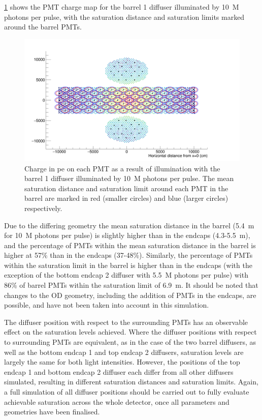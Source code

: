\documentclass[a4paper,11pt]{article}
\begin{document}
\cref{fig:pmtmap_with_limits} shows the PMT charge map for the barrel 1 diffuser illuminated by 10~M photons per pulse, with the saturation distance and saturation limits marked around the barrel PMTs.

\begin{figure}[ht!]
\centering
\includegraphics[width=0.7\linewidth]{diffuse_QCoverage_with_limits.png}
         \caption{Charge in pe on each PMT as a result of illumination with the barrel 1 diffuser illuminated by 10~M photons per pulse. The mean saturation distance and saturation limit around each PMT in the barrel are marked in red (smaller circles) and blue (larger circles) respectively.}
         \label{fig:pmtmap_with_limits}
\end{figure}

Due to the differing geometry the mean saturation distance in the barrel (5.4~m for 10~M photons per pulse) is slightly higher than in the endcaps (4.3-5.5~m), and the percentage of PMTs within the mean saturation distance in the barrel is higher at 57\% than in the endcaps (37-48\%). Similarly, the percentage of PMTs within the saturation limit in the barrel is higher than in the endcaps (with the exception of the bottom endcap 2 diffuser with 5.5~M photons per pulse) with 86\% of barrel PMTs within the saturation limit of 6.9~m. It should be noted that changes to the OD geometry, including the addition of PMTs in the endcaps, are possible, and have not been taken into account in this simulation. 

The diffuser position with respect to the surrounding PMTs has an observable effect on the saturation levels achieved. Where the diffuser positions with respect to surrounding PMTs are equivalent, as in the case of the two barrel diffusers, as well as the bottom endcap 1 and top endcap 2 diffusers, saturation levels are largely the same for both light intensities. However, the positions of the top endcap 1 and bottom endcap 2 diffuser each differ from all other diffusers simulated, resulting in different saturation distances and saturation limits. Again, a full simulation of all diffuser positions should be carried out to fully evaluate achievable saturation across the whole detector, once all parameters and geometries have been finalised.
\end{document}
